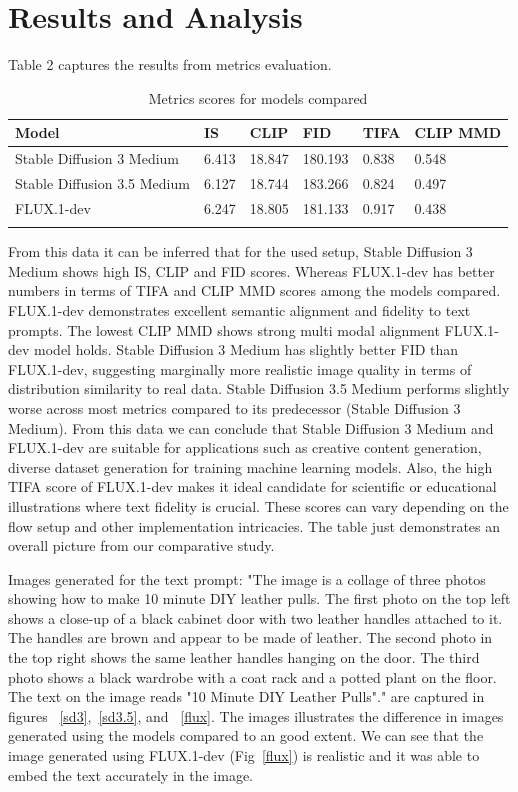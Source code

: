 \documentclass{article}
\begin{document}
\section{Results and Analysis}
Table 2 captures the results from metrics evaluation. 
\begin{table}[H]
	\centering
	\begin{tabular}{p{2in} p{0.5in} p{0.5in} p{0.5in} p{0.5in} p{0.8in}}
		\toprule
		\textbf{Model} & \textbf{IS} & \textbf{CLIP} & \textbf{FID} & \textbf{TIFA} & \textbf{CLIP MMD}\\
		\midrule
		Stable Diffusion 3 Medium & 6.413 & 18.847 & 180.193 & 0.838 & 0.548\\
		Stable Diffusion 3.5 Medium & 6.127 & 18.744 & 183.266 & 0.824 & 0.497\\
		FLUX.1-dev & 6.247 & 18.805 & 181.133 & 0.917 & 0.438\\
		\bottomrule
		\\
	\end{tabular}
	\label{tab:metrics}
	\caption{Metrics scores for models compared}
\end{table}

From this data it can be inferred that for the used setup, Stable Diffusion 3 Medium shows high IS, CLIP and FID scores. Whereas FLUX.1-dev has better numbers in terms of TIFA and CLIP MMD scores among the models compared. FLUX.1-dev demonstrates excellent semantic alignment and fidelity to text prompts. The lowest CLIP MMD shows strong multi modal alignment FLUX.1-dev model holds. Stable Diffusion 3 Medium has slightly better FID than FLUX.1-dev, suggesting marginally more realistic image quality in terms of distribution similarity to real data. Stable Diffusion 3.5 Medium performs slightly worse across most metrics compared to its predecessor (Stable Diffusion 3 Medium). From this data we can conclude that Stable Diffusion 3 Medium and  FLUX.1-dev are suitable for applications such as creative content generation, diverse dataset generation for training machine learning models. Also, the high TIFA score of FLUX.1-dev makes it ideal candidate for scientific or educational illustrations where text fidelity is crucial. These scores can vary depending on the flow setup and other implementation intricacies. The table just demonstrates an overall picture from our comparative study.\par Images generated for the text prompt: "The image is a collage of three photos showing how to make 10 minute DIY leather pulls. The first photo on the top left shows a close-up of a black cabinet door with two leather handles attached to it. The handles are brown and appear to be made of leather. The second photo in the top right shows the same leather handles hanging on the door. The third photo shows a black wardrobe with a coat rack and a potted plant on the floor. The text on the image reads "10 Minute DIY Leather Pulls"." are captured in figures ~\ref{sd3},~\ref{sd3.5}, and ~\ref{flux}. The images illustrates the difference in images generated using the models compared to an good extent. We can see that the image generated using FLUX.1-dev (Fig~\ref{flux}) is realistic and it was able to embed the text accurately in the image.
\end{document}
